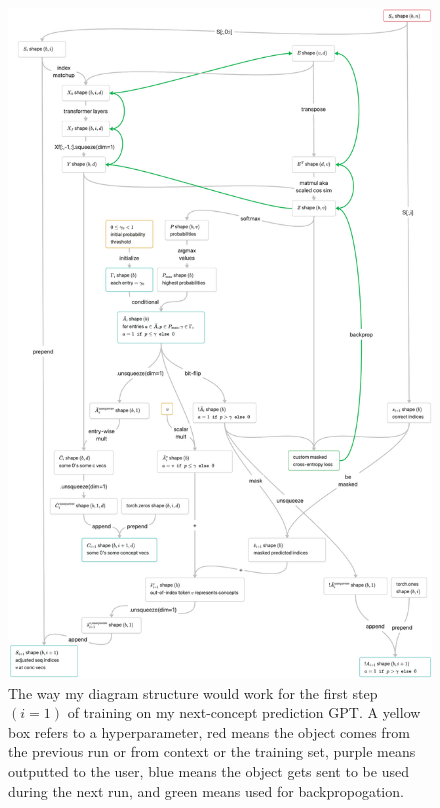 \documentclass{article}
\begin{document}
\newpage
\begin{figure}[!htb]
    \centering
    \includegraphics[height=0.9\textheight]{NCP_i=1_train.png}
    \caption{The way my diagram structure would work for the first step $(i=1)$ of training on my next-concept prediction GPT. A yellow box refers to a hyperparameter, red means the object comes from the previous run or from context or the training set, purple means outputted to the user, blue means the object gets sent to be used during the next run, and green means used for backpropogation.}
    \label{fig:ncp_i=1_train}
\end{figure}
\end{document}
